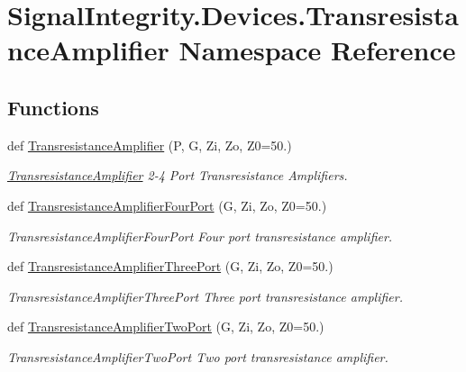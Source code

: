 \hypertarget{namespaceSignalIntegrity_1_1Devices_1_1TransresistanceAmplifier}{}\section{Signal\+Integrity.\+Devices.\+Transresistance\+Amplifier Namespace Reference}
\label{namespaceSignalIntegrity_1_1Devices_1_1TransresistanceAmplifier}
\subsection*{Functions}
\begin{DoxyCompactItemize}
\item 
def \hyperlink{namespaceSignalIntegrity_1_1Devices_1_1TransresistanceAmplifier_a9ff76e46141bb878459e8d63b0886c88}{Transresistance\+Amplifier} (P, G, Zi, Zo, Z0=50.)
\begin{DoxyCompactList}\small\item\em \hyperlink{namespaceSignalIntegrity_1_1Devices_1_1TransresistanceAmplifier}{Transresistance\+Amplifier} 2-\/4 Port Transresistance Amplifiers. \end{DoxyCompactList}\item 
def \hyperlink{namespaceSignalIntegrity_1_1Devices_1_1TransresistanceAmplifier_adb42794a9f058c4ce8b393f798f929f2}{Transresistance\+Amplifier\+Four\+Port} (G, Zi, Zo, Z0=50.)
\begin{DoxyCompactList}\small\item\em Transresistance\+Amplifier\+Four\+Port Four port transresistance amplifier. \end{DoxyCompactList}\item 
def \hyperlink{namespaceSignalIntegrity_1_1Devices_1_1TransresistanceAmplifier_adc9654f2a1c81ee6511a3ef0aa16f5d9}{Transresistance\+Amplifier\+Three\+Port} (G, Zi, Zo, Z0=50.)
\begin{DoxyCompactList}\small\item\em Transresistance\+Amplifier\+Three\+Port Three port transresistance amplifier. \end{DoxyCompactList}\item 
def \hyperlink{namespaceSignalIntegrity_1_1Devices_1_1TransresistanceAmplifier_a3d51986593632eba2c2bd42414ae8ad6}{Transresistance\+Amplifier\+Two\+Port} (G, Zi, Zo, Z0=50.)
\begin{DoxyCompactList}\small\item\em Transresistance\+Amplifier\+Two\+Port Two port transresistance amplifier. \end{DoxyCompactList}\end{DoxyCompactItemize}


